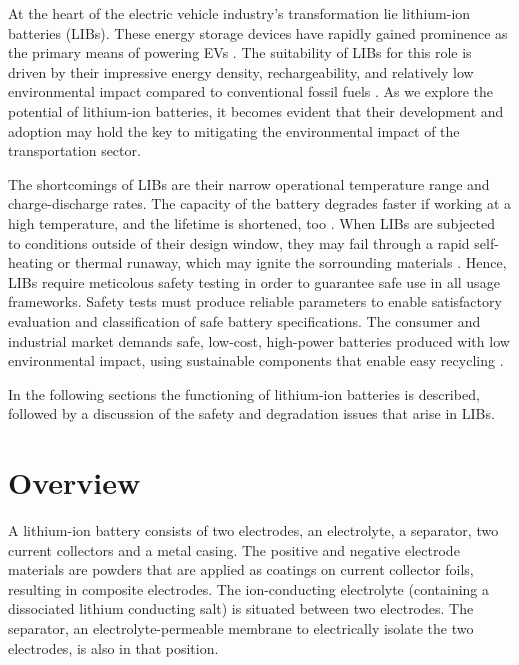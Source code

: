 
At the heart of the electric vehicle industry's transformation lie lithium-ion batteries (LIBs). These energy storage devices have rapidly gained prominence as the primary means of powering EVs \cite{zubi2018lithium,stampatori2020li}. The suitability of LIBs for this role is driven by their impressive energy density, rechargeability, and relatively low environmental impact compared to conventional fossil fuels \cite{korthauer2018lithium}. As we explore the potential of lithium-ion batteries, it becomes evident that their development and adoption may hold the key to mitigating the environmental impact of the transportation sector. 

The shortcomings of LIBs are their narrow operational temperature range and charge-discharge rates. The capacity of the battery degrades faster if working at a high temperature, and the lifetime is shortened, too \cite{ma2018temperature,ning2003capacity}. When LIBs are subjected to conditions outside of their design window, they may fail through a rapid self-heating or thermal runaway, which may ignite the sorrounding materials \cite{palacin2016batteries}. 
Hence, LIBs require meticolous safety testing in order to guarantee safe use in all usage frameworks. Safety tests must produce reliable parameters to enable satisfactory evaluation and classification of safe battery specifications. The consumer and industrial market demands safe, low-cost, high-power batteries produced with low environmental impact, using sustainable components that enable easy recycling \cite{doughty2012general}.

In the following sections the functioning of lithium-ion batteries is described, followed by a discussion of the safety and degradation issues that arise in LIBs.

\section{Overview}
\label{sec:overview}
A lithium-ion battery consists of two electrodes, an electrolyte, a separator, two current collectors and a metal casing. The positive and negative electrode materials are powders that are applied as coatings on current collector foils, resulting in composite electrodes. The ion-conducting electrolyte (containing a dissociated lithium conducting salt) is situated between two electrodes. The separator, an electrolyte-permeable membrane to electrically isolate the two electrodes, is also in that position.

